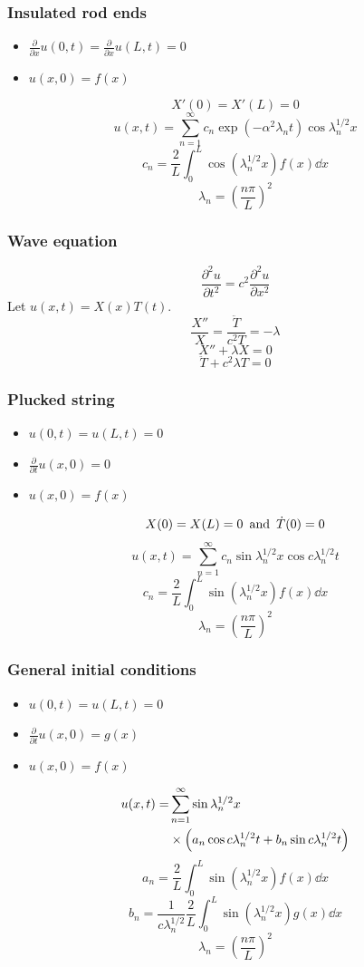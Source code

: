 \documentclass{article}
\begin{document}
\begin{multicols}{3}
\subsubsection*{Insulated rod ends}
\begin{itemize}
    \item $\displaystyle\frac{\partial}{\partial x}u(0,t)
    =\displaystyle\frac{\partial}{\partial x}u(L,t)=0$
    \item $u(x,0)=f(x)$
\end{itemize}
$$X'(0)=X'(L)=0$$
$$u(x,t)=\sum_{n=1}^{\infty}c_n\exp(-\alpha^2\lambda_n t)
\cos\lambda_n^{1/2}x$$
$$c_n=\frac{2}{L}\int_{0}^{L}
\cos(\lambda_n^{1/2}x) f(x)\dd x$$
$$\lambda_n=\left(\frac{n\pi}{L}\right)^2$$

\subsubsection*{Wave equation}
$$\frac{\partial^2u}{\partial t^2}=c^2\frac{\partial^2u}{\partial x^2}$$
Let $u(x,t)=X(x)T(t)$.
$$\frac{X''}{X}=\frac{\ddot{T}}{c^2 T}=-\lambda$$
$$X''+\lambda X=0$$
$$\ddot{T}+c^2\lambda T=0$$

\subsubsection*{Plucked string}
\begin{itemize}
    \item $u(0,t)=u(L,t)=0$
    \item $\displaystyle\frac{\partial}{\partial t}
    u(x,0)=0$
    \item $u(x,0)=f(x)$
\end{itemize}
$$X(0)=X(L)=0
\hspace{0.07in}\text{and}\hspace{0.07in}
\dot{T}(0)=0$$
$$u(x,t)=\sum_{n=1}^{\infty}c_n\sin\lambda_n^{1/2}x
\cos c\lambda_n^{1/2}t$$
$$c_n=\frac{2}{L}\int_{0}^{L}
\sin(\lambda_n^{1/2}x) f(x)\dd x$$
$$\lambda_n=\left(\frac{n\pi}{L}\right)^2$$

\subsubsection*{General initial conditions}
\begin{itemize}
    \item $u(0,t)=u(L,t)=0$
    \item $\displaystyle\frac{\partial}{\partial t}
    u(x,0)=g(x)$
    \item $u(x,0)=f(x)$
\end{itemize}
\begin{align*}
    u(x,t)=&\sum_{n=1}^{\infty}\sin\lambda_n^{1/2}x \\
    &\times\Bigl(a_n\cos c\lambda_n^{1/2}t
    +b_n\sin c\lambda_n^{1/2}t\Bigr)
\end{align*}
$$a_n=\frac{2}{L}\int_{0}^{L}
\sin(\lambda_n^{1/2}x)f(x)\dd x$$
$$b_n=\frac{1}{c\lambda_n^{1/2}}\frac{2}{L}
\int_{0}^{L}\sin(\lambda_n^{1/2}x)g(x)\dd x$$
$$\lambda_n=\left(\frac{n\pi}{L}\right)^2$$


\end{multicols}
\end{document}

